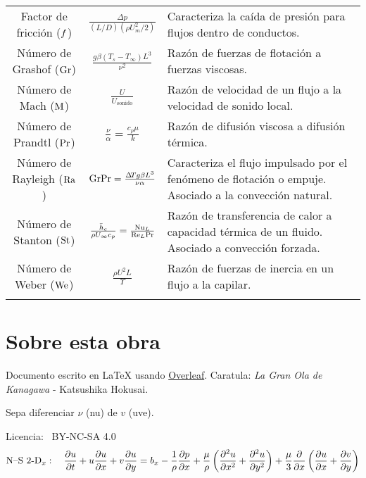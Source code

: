 \begin{table}[htb!]
\begin{tabularx}{12cm}{ *{2}{c}
>{\scriptsize\arraybackslash}X }
Factor de fricción ($f$) & $ \frac{\Delta p}{(L/D)\left(\rho U^2_m/2\right)}$          &Caracteriza la caída de presión para flujos dentro de conductos.                \\
Número de Grashof ($\textrm{Gr}$) &  $\frac{g\beta \left(T_s -T_\infty \right) L^3}{\nu^2}$          &Razón de fuerzas de flotación a fuerzas viscosas.                \\
Número de Mach   ($\textrm{M}$)   &    $\frac{U}{U_{\textrm{sonido}}}$        & Razón de velocidad de un flujo a la velocidad de sonido local.              \\
Número de Prandtl  ($\textrm{Pr}$) &     $\frac{\nu}{\alpha}=\frac{c_p \mu}{k}$       &Razón de difusión viscosa a difusión térmica.               \\
Número de Rayleigh ($\textrm{Ra}$) &  $\textrm{Gr}\textrm{Pr} = \frac{\Delta \!T g\beta L^3}{\nu \alpha}$          & Caracteriza el flujo impulsado por el fenómeno de flotación o empuje. Asociado a la convección natural.             \\
Número de Stanton ($\textrm{St}$)  &   $\frac{\bar{h}_c }{\rho U_\infty c_p}=\frac{\textrm{Nu}_L}{\textrm{Re}_L \textrm{Pr}}$         &Razón de transferencia de calor a capacidad térmica de un fluido. Asociado a convección forzada.\\
Número de Weber ($\textrm{We}$)  &   $\frac{\rho U^2 L}{\Upsilon}$         &Razón de fuerzas de inercia en un flujo a la capilar.\\
\hhline
\end{tabularx}
\end{table} 

\tableofcontents

\section*{Sobre esta obra}
Documento escrito en \textrm{\LaTeX} usando \href{https://www.overleaf.com}{Overleaf}. Caratula: \emph{ La Gran Ola de Kanagawa }- Katsushika Hokusai. \par

Sepa diferenciar $\nu$ (nu) de $v$ (uve).\par
 \vspace{.1cm}
 \vspace{1cm}
 \begingroup

\selectfont
\noindent
 Licencia: \faCreativeCommons~BY-NC-SA 4.0
 \endgroup
 \begingroup
    $$\textrm{N--S 2-D}_x:\quad \frac{\partial u}{\partial t}+u\frac{\partial u}{\partial x}+v\frac{\partial u}{\partial y}=b_x-\frac{1}{\rho}\frac{\partial p}{\partial x}+\frac{\mu}{\rho}\left(\frac{\partial^2 u}{\partial x ^2}+\frac{\partial^2 u}{\partial y ^2}\right) + \frac{\mu}{3}\frac{\partial  }{\partial x}\left( \frac{\partial u}{\partial x}+\frac{\partial v}{\partial y}\right)$$
 \endgroup